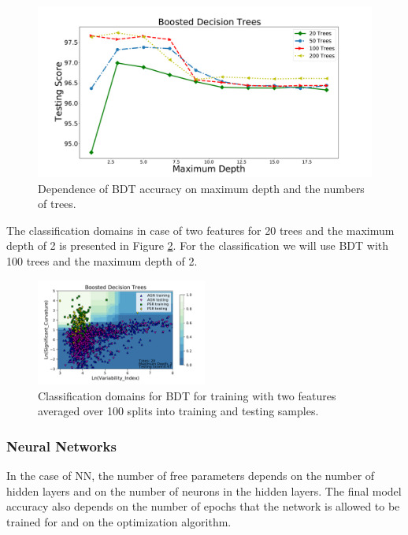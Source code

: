 \begin{figure}[h]
\includegraphics[width=\twopicsp\textwidth]{plots/bdt_train_assocnewfeats.pdf}
\caption{Dependence of BDT accuracy on maximum depth and the numbers of trees.}
\label{fig:BDT_depth}
\end{figure}

The classification domains in case of two features for 20 trees and the maximum depth of 2 is presented in Figure \ref{fig:BDT_domains}. 
For the classification we will use BDT with 100 trees and the maximum depth of 2.


\begin{figure}[h]
\includegraphics[width=0.5\textwidth]{plots/classification_domains/bdt_20_2.pdf}
\caption{Classification domains for BDT for training with two features 
averaged over 100 splits into training and testing samples.
}
\label{fig:BDT_domains}
\end{figure}






\subsubsection{Neural Networks}

In the case of NN, the number of free parameters depends on the number of hidden layers and on the number of neurons in the hidden layers. The final model accuracy also depends on the number of epochs that the network is allowed to be trained for and on the optimization algorithm. 

